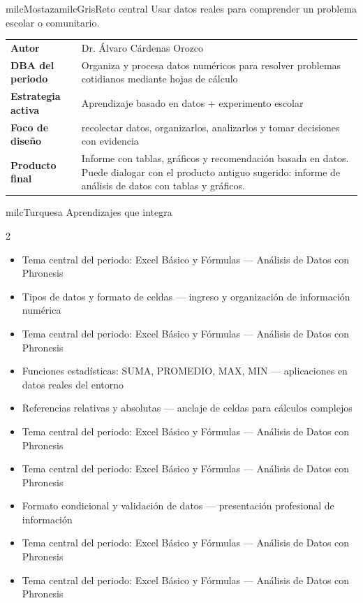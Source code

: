 \documentclass[11pt,letterpaper]{article}
\begin{document}
\begin{softbox}{milcMostaza}{milcGris}{Reto central}
Usar datos reales para comprender un problema escolar o comunitario.
\end{softbox}

\begin{tabularx}{\textwidth}{>{\bfseries}p{3.4cm}X}
\rowcolor{milcMagenta!12}Autor & Dr. Álvaro Cárdenas Orozco\\
DBA del periodo & Organiza y procesa datos numéricos para resolver problemas cotidianos mediante hojas de cálculo\\
Estrategia activa & Aprendizaje basado en datos + experimento escolar\\
Foco de diseño & recolectar datos, organizarlos, analizarlos y tomar decisiones con evidencia\\
Producto final & Informe con tablas, gráficos y recomendación basada en datos. Puede dialogar con el producto antiguo sugerido: informe de análisis de datos con tablas y gráficos.\\
\end{tabularx}

\begin{titlebox}{milcTurquesa}
Aprendizajes que integra
\end{titlebox}
\begin{multicols}{2}
\begin{itemize}[leftmargin=*]
\item Tema central del periodo: Excel Básico y Fórmulas — Análisis de Datos con Phronesis
\item Tipos de datos y formato de celdas — ingreso y organización de información numérica
\item Tema central del periodo: Excel Básico y Fórmulas — Análisis de Datos con Phronesis
\item Funciones estadísticas: SUMA, PROMEDIO, MAX, MIN — aplicaciones en datos reales del entorno
\item Referencias relativas y absolutas — anclaje de celdas para cálculos complejos
\item Tema central del periodo: Excel Básico y Fórmulas — Análisis de Datos con Phronesis
\item Tema central del periodo: Excel Básico y Fórmulas — Análisis de Datos con Phronesis
\item Formato condicional y validación de datos — presentación profesional de información
\item Tema central del periodo: Excel Básico y Fórmulas — Análisis de Datos con Phronesis
\item Tema central del periodo: Excel Básico y Fórmulas — Análisis de Datos con Phronesis
\end{itemize}
\end{multicols}
\end{document}
